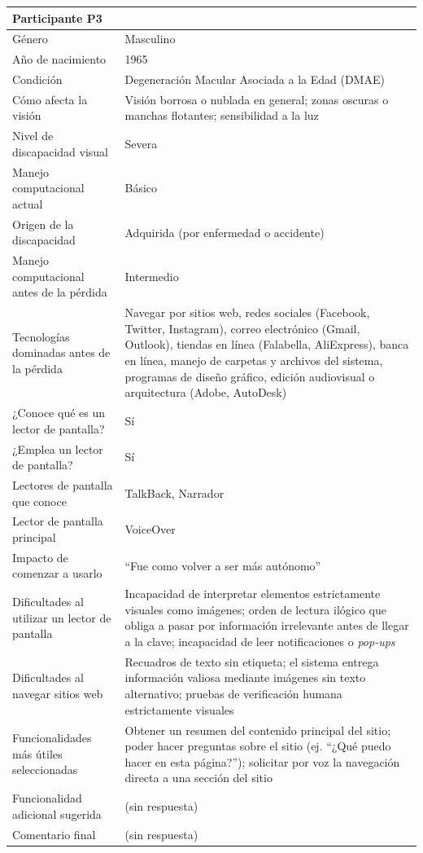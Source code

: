 \begin{longtable}{|p{4cm}|p{10.5cm}|}
    \multicolumn{2}{|l|}{\textbf{Participante P3}} \\
    \hline
    Género & Masculino \\
    \hline
    Año de nacimiento & 1965 \\
    \hline
    Condición & Degeneración Macular Asociada a la Edad (DMAE) \\
    \hline
    Cómo afecta la visión & Visión borrosa o nublada en general; zonas oscuras o manchas flotantes; sensibilidad a la luz \\
    \hline
    Nivel de discapacidad visual & Severa \\
    \hline
    Manejo computacional actual & Básico \\
    \hline
    Origen de la discapacidad & Adquirida (por enfermedad o accidente) \\
    \hline
    Manejo computacional antes de la pérdida & Intermedio \\
    \hline
    Tecnologías dominadas antes de la pérdida & Navegar por sitios web, redes sociales (Facebook, Twitter, Instagram), correo electrónico (Gmail, Outlook), tiendas en línea (Falabella, AliExpress), banca en línea, manejo de carpetas y archivos del sistema, programas de diseño gráfico, edición audiovisual o arquitectura (Adobe, AutoDesk) \\
    \hline
    ¿Conoce qué es un lector de pantalla? & Sí \\
    \hline
    ¿Emplea un lector de pantalla? & Sí \\
    \hline
    Lectores de pantalla que conoce & TalkBack, Narrador \\
    \hline
    Lector de pantalla principal & VoiceOver \\
    \hline
    Impacto de comenzar a usarlo & ``Fue como volver a ser más autónomo'' \\
    \hline
    Dificultades al utilizar un lector de pantalla & Incapacidad de interpretar elementos estrictamente visuales como imágenes; orden de lectura ilógico que obliga a pasar por información irrelevante antes de llegar a la clave; incapacidad de leer notificaciones o \textit{pop-ups} \\
    \hline
    Dificultades al navegar sitios web & Recuadros de texto sin etiqueta; el sistema entrega información valiosa mediante imágenes sin texto alternativo; pruebas de verificación humana estrictamente visuales \\
    \hline
    Funcionalidades más útiles seleccionadas & Obtener un resumen del contenido principal del sitio; poder hacer preguntas sobre el sitio (ej. ``¿Qué puedo hacer en esta página?''); solicitar por voz la navegación directa a una sección del sitio \\
    \hline
    Funcionalidad adicional sugerida & (sin respuesta) \\
    \hline
    Comentario final & (sin respuesta) \\
    \hline


\end{longtable}
